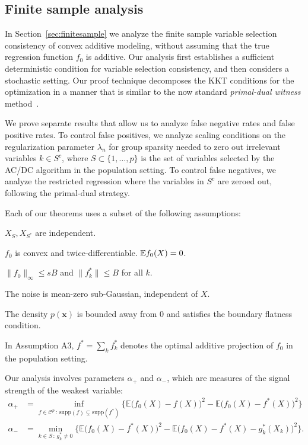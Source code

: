 \subsection{Finite sample analysis}


In Section~\ref{sec:finitesample} 
we analyze the finite sample variable selection consistency of convex
additive modeling, without assuming that the true
regression function $f_0$ is additive.  Our analysis first establishes
a sufficient deterministic condition for variable selection 
consistency, and then considers a stochastic setting.
Our proof technique decomposes the KKT conditions for the optimization
in a manner that is similar to the now standard \emph{primal-dual
  witness} method~\citep{wainwright2009sharp}. 

We prove separate results that allow us to analyze false negative
rates and false positive rates.  To control false positives,
we analyze scaling conditions on the regularization parameter
$\lambda_n$ for 
group sparsity needed to zero out irrelevant variables
$k \in S^c$, where $S\subset \{1,\ldots, p\}$ is the set of
variables selected by the AC/DC algorithm in the population setting.
To control false negatives, we analyze the restricted regression
where the variables in $S^c$ are zeroed out, following the primal-dual
strategy.  

Each of our theorems uses a subset of the following assumptions:
\begin{packed_enum}
\item[A1:] $X_S, X_{S^c}$ are independent. 
\item[A2:] $f_0$ is convex and twice-differentiable. ${\mathbb E} f_0(X) = 0$.
\item[A3:] $\|f_0\|_\infty \leq sB$ and $\|f^*_k \| \leq B$ for all $k$.
\item[A4:] The noise is mean-zero sub-Gaussian, independent of $X$.
\item[A5:] The density $p(\mathbf{x})$ is bounded away from 0 and satisfies the boundary flatness condition.
\end{packed_enum}
In Assumption A3, $f^*=\sum_k f^*_k$ denotes the optimal additive projection of $f_0$ in the population setting.

Our analysis involves parameters $\alpha_+$ and $\alpha_-$,
which are measures of the signal strength of the weakest variable:
\begin{align*}
\alpha_+ &= \inf_{f \in \mathcal{C}^p \,:\, \textrm{supp}(f)\subsetneq \textrm{supp}(f^*)} 
       \Big\{ \mathbb{E} \big( f_0(X) - f(X) \big)^2 - 
        \mathbb{E} \big( f_0(X) - f^*(X) \big)^2  \Big\}\\
\alpha_- &=   \min_{k \in S \,:\, g^*_k \neq 0}
      \Big\{ \mathbb{E} \big( f_0(X) - f^*(X) \big)^2 - 
    \mathbb{E} \big( f_0(X) - f^*(X) - g^*_k(X_k) \big)^2 \Big\}.
\end{align*}

